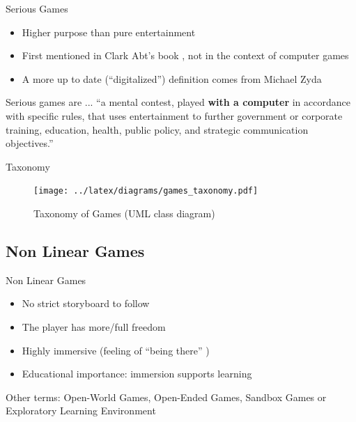 \documentclass[compress]{beamer}
\begin{document}
\begin{frame}{Serious Games}
\pause
\begin{itemize}
\item Higher purpose than pure entertainment
\item First mentioned in Clark Abt's book \cite{Abt1987}, not in the context of computer games
\item A more up to date (``digitalized'') definition comes from Michael Zyda \cite{Zyda2005}
\end{itemize}
\pause
\begin{block}{Serious games are ...}
``a mental
contest, played \textbf{with a computer} in accordance with specific rules, that uses
entertainment to further government or corporate training, education, health,
public policy, and strategic communication objectives.'' \cite{Zyda2005}
\end{block}
\end{frame}

\begin{frame}{Taxonomy}
\begin{figure}
    \centering
    \texttt{[image: ../latex/diagrams/games\_taxonomy.pdf]}
    \caption[Taxonomy of Games (UML class diagram)]
    {Taxonomy of Games (UML class diagram)}
    \label{taxonomy_games}
\end{figure}
\end{frame}

\subsection{Non Linear Games}

\begin{frame}{Non Linear Games}
\pause
\begin{itemize}
\item No strict storyboard to follow
\item The player has more/full freedom
\item Highly immersive (feeling of ``being there'' \cite{Psotka1995a})
\item Educational importance: immersion supports learning \cite{Zimmerman2000a, Seah2008a}
\end{itemize}
\pause
\begin{block}{Other terms:}
Open-World Games, Open-Ended Games, Sandbox Games or Exploratory Learning Environment
\end{block}
\end{frame}
\end{document}
